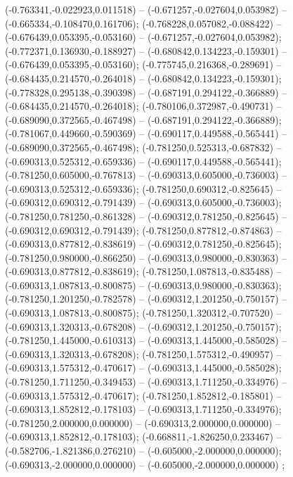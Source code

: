  (-0.763341,-0.022923,0.011518) -- (-0.671257,-0.027604,0.053982) -- (-0.665334,-0.108470,0.161706);
 (-0.768228,0.057082,-0.088422) -- (-0.676439,0.053395,-0.053160) -- (-0.671257,-0.027604,0.053982);
 (-0.772371,0.136930,-0.188927) -- (-0.680842,0.134223,-0.159301) -- (-0.676439,0.053395,-0.053160);
 (-0.775745,0.216368,-0.289691) -- (-0.684435,0.214570,-0.264018) -- (-0.680842,0.134223,-0.159301);
 (-0.778328,0.295138,-0.390398) -- (-0.687191,0.294122,-0.366889) -- (-0.684435,0.214570,-0.264018);
 (-0.780106,0.372987,-0.490731) -- (-0.689090,0.372565,-0.467498) -- (-0.687191,0.294122,-0.366889);
 (-0.781067,0.449660,-0.590369) -- (-0.690117,0.449588,-0.565441) -- (-0.689090,0.372565,-0.467498);
 (-0.781250,0.525313,-0.687832) -- (-0.690313,0.525312,-0.659336) -- (-0.690117,0.449588,-0.565441);
 (-0.781250,0.605000,-0.767813) -- (-0.690313,0.605000,-0.736003) -- (-0.690313,0.525312,-0.659336);
 (-0.781250,0.690312,-0.825645) -- (-0.690312,0.690312,-0.791439) -- (-0.690313,0.605000,-0.736003);
 (-0.781250,0.781250,-0.861328) -- (-0.690312,0.781250,-0.825645) -- (-0.690312,0.690312,-0.791439);
 (-0.781250,0.877812,-0.874863) -- (-0.690313,0.877812,-0.838619) -- (-0.690312,0.781250,-0.825645);
 (-0.781250,0.980000,-0.866250) -- (-0.690313,0.980000,-0.830363) -- (-0.690313,0.877812,-0.838619);
 (-0.781250,1.087813,-0.835488) -- (-0.690313,1.087813,-0.800875) -- (-0.690313,0.980000,-0.830363);
 (-0.781250,1.201250,-0.782578) -- (-0.690312,1.201250,-0.750157) -- (-0.690313,1.087813,-0.800875);
 (-0.781250,1.320312,-0.707520) -- (-0.690313,1.320313,-0.678208) -- (-0.690312,1.201250,-0.750157);
 (-0.781250,1.445000,-0.610313) -- (-0.690313,1.445000,-0.585028) -- (-0.690313,1.320313,-0.678208);
 (-0.781250,1.575312,-0.490957) -- (-0.690313,1.575312,-0.470617) -- (-0.690313,1.445000,-0.585028);
 (-0.781250,1.711250,-0.349453) -- (-0.690313,1.711250,-0.334976) -- (-0.690313,1.575312,-0.470617);
 (-0.781250,1.852812,-0.185801) -- (-0.690313,1.852812,-0.178103) -- (-0.690313,1.711250,-0.334976);
 (-0.781250,2.000000,0.000000) -- (-0.690313,2.000000,0.000000) -- (-0.690313,1.852812,-0.178103);
 (-0.668811,-1.826250,0.233467) -- (-0.582706,-1.821386,0.276210) -- (-0.605000,-2.000000,0.000000);
 (-0.690313,-2.000000,0.000000) -- (-0.605000,-2.000000,0.000000) ;
